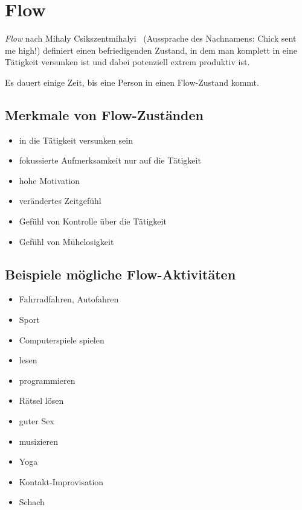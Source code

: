 \section{Flow}
\label{flow}

\emph{Flow} nach Mihaly Csikszentmihalyi~\cite{flow} (Aussprache des Nachnamens: \glqq Chick sent me high!\grqq) definiert einen befriedigenden Zustand, in dem man komplett in eine Tätigkeit versunken ist und dabei potenziell extrem produktiv ist.

Es dauert einige Zeit, bis eine Person in einen Flow-Zustand kommt.

\subsection{Merkmale von Flow-Zuständen}

\begin{itemize}
    \item \glqq in die Tätigkeit versunken sein\grqq
    \item fokussierte Aufmerksamkeit nur auf die Tätigkeit
    \item hohe Motivation
    \item verändertes Zeitgefühl
    \item Gefühl von Kontrolle über die Tätigkeit
    \item Gefühl von Mühelosigkeit
\end{itemize}

\subsection{Beispiele mögliche Flow-Aktivitäten}

\begin{itemize}
    \item Fahrradfahren, Autofahren
    \item Sport
    \item Computerspiele spielen
    \item lesen
    \item programmieren
    \item Rätsel lösen
    \item guter Sex
    \item musizieren
    \item Yoga
    \item Kontakt-Improvisation
    \item Schach
\end{itemize}

